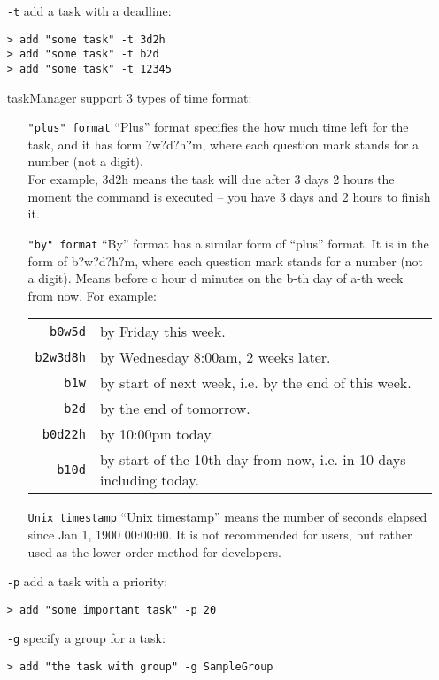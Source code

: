 \documentclass[12pt, a4paper]{article}
\begin{document}
\begin{enumerate}
\item [ \texttt{-t} ] add a task with a deadline:

  \texttt{\textgreater \ add "some task" -t 3d2h\\
    \textgreater \ add "some task" -t b2d\\
    \textgreater \ add "some task" -t 12345}

taskManager support 3 types of time format:

\begin{enumerate}
\item[ \texttt{"plus" format} ]
  ``Plus'' format specifies the how much time left for the task, and it has form ?w?d?h?m\footnotemark, where each question mark stands for a number (not a digit).\\
  For example, 3d2h means the task will due after 3 days 2 hours the moment the command is executed -- you have 3 days and 2 hours to finish it.


\item[ \texttt{"by" format} ]
  ``By'' format has a similar form of ``plus'' format. It is in the form of b?w?d?h?m\footnotemark, where each question mark stands for a number (not a digit).
  Means before c hour d minutes on the b-th day of a-th week from now. For example:

  \begin{tabular}{ r | l }
    \texttt{b0w5d} & by Friday this week.\\
    \texttt{b2w3d8h} & by Wednesday 8:00am, 2 weeks later.\\
    \texttt{b1w} & by start of next week, i.e. by the end of this week.\\
    \texttt{b2d} & by the end of tomorrow.\\
    \texttt{b0d22h} & by 10:00pm today.\\
    \texttt{b10d} & by start of the 10th day from now, i.e. in 10 days including today.\\
  \end{tabular}

\item[ \texttt{Unix timestamp} ]
``Unix timestamp'' means the number of seconds elapsed since Jan 1, 1900 00:00:00. It is not recommended for users, but rather used as the lower-order method for developers.
\end{enumerate}

\item[ \texttt{-p} ] add a task with a priority:

\texttt{\textgreater \ add "some important task" -p 20}\\

\item[ \texttt{-g} ] specify a group for a task:

\texttt{\textgreater \ add "the task with group"\footnotemark \  -g SampleGroup}\\

\end{enumerate}
\end{document}
